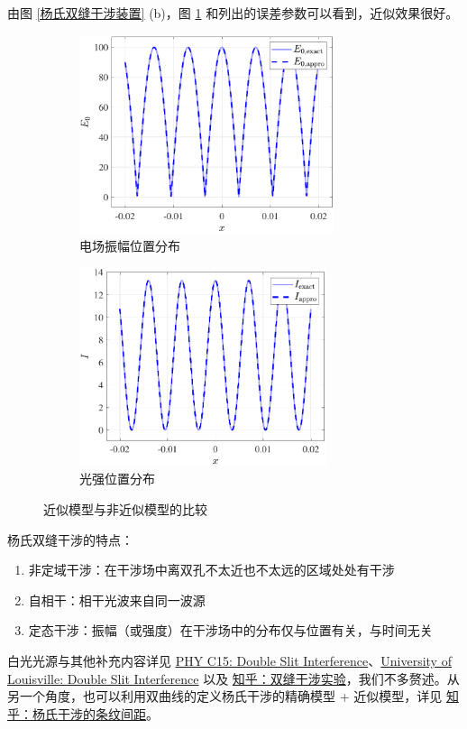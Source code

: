 \documentclass[UTF8]{report}
\theoremstyle{MyLineTheoremStyle} %
\theoremstyle{MyBlockTheoremStyle} %
\theoremstyle{MySubsubsectionStyle} %
\begin{document}
由图 \ref{杨氏双缝干涉装置} (b)，图 \ref{近似模型与非近似模型的比较} 和列出的误差参数可以看到，近似效果很好。

\begin{figure}[H]\centering
\begin{subfigure}[t]{0.5\columnwidth}\centering
    \includegraphics[height=165pt]{assets/3/杨电场.pdf}
    \caption{ 电场振幅位置分布 }
\end{subfigure}\hfill
\begin{subfigure}[t]{0.5\columnwidth}\centering
    \includegraphics[height=165pt]{assets/3/杨光强.pdf}
    \caption{ 光强位置分布 }
\end{subfigure}
\caption{ 近似模型与非近似模型的比较 }\label{近似模型与非近似模型的比较}
\end{figure}

\noindent 杨氏双缝干涉的特点：
\begin{enumerate}
\item 非定域干涉：在干涉场中离双孔不太近也不太远的区域处处有干涉
\item 自相干：相干光波来自同一波源
\item 定态干涉：振幅（或强度）在干涉场中的分布仅与位置有关，与时间无关
\end{enumerate}


白光光源与其他补充内容详见 \href{https://produckthieves.home.blog/2020/02/10/phy-c15-double-slit-interference/}{PHY C15: Double Slit Interference}、\href{https://www.physics.louisville.edu/cldavis/phys299/notes/lo_interference.html}{University of Louisville: Double Slit Interference} 以及 \href{https://zhuanlan.zhihu.com/p/335815195}{知乎：双缝干涉实验}，我们不多赘述。从另一个角度，也可以利用双曲线的定义杨氏干涉的精确模型 + 近似模型，详见 \href{https://www.zhihu.com/question/382600481/answer/2565939868}{知乎：杨氏干涉的条纹间距}。
\end{document}
